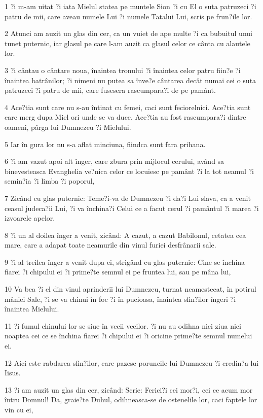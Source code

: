 \par 1 ?i m-am uitat ?i iata Mielul statea pe muntele Sion ?i cu El o suta patruzeci ?i patru de mii, care aveau numele Lui ?i numele Tatalui Lui, scris pe frun?ile lor.
\par 2 Atunci am auzit un glas din cer, ca un vuiet de ape multe ?i ca bubuitul unui tunet puternic, iar glasul pe care l-am auzit ca glasul celor ce cânta cu alautele lor.
\par 3 ?i cântau o cântare noua, înaintea tronului ?i înaintea celor patru fiin?e ?i înaintea batrânilor; ?i nimeni nu putea sa înve?e cântarea decât numai cei o suta patruzeci ?i patru de mii, care fusesera rascumpara?i de pe pamânt.
\par 4 Ace?tia sunt care nu s-au întinat cu femei, caci sunt feciorelnici. Ace?tia sunt care merg dupa Miel ori unde se va duce. Ace?tia au fost rascumpara?i dintre oameni, pârga lui Dumnezeu ?i Mielului.
\par 5 Iar în gura lor nu s-a aflat minciuna, fiindca sunt fara prihana.
\par 6 ?i am vazut apoi alt înger, care zbura prin mijlocul cerului, având sa binevesteasca Evanghelia ve?nica celor ce locuiesc pe pamânt ?i la tot neamul ?i semin?ia ?i limba ?i poporul,
\par 7 Zicând cu glas puternic: Teme?i-va de Dumnezeu ?i da?i Lui slava, ca a venit ceasul judeca?ii Lui, ?i va închina?i Celui ce a facut cerul ?i pamântul ?i marea ?i izvoarele apelor.
\par 8 ?i un al doilea înger a venit, zicând: A cazut, a cazut Babilonul, cetatea cea mare, care a adapat toate neamurile din vinul furiei desfrânarii sale.
\par 9 ?i al treilea înger a venit dupa ei, strigând cu glas puternic: Cine se închina fiarei ?i chipului ei ?i prime?te semnul ei pe fruntea lui, sau pe mâna lui,
\par 10 Va bea ?i el din vinul aprinderii lui Dumnezeu, turnat neamestecat, în potirul mâniei Sale, ?i se va chinui în foc ?i în pucioasa, înaintea sfin?ilor îngeri ?i înaintea Mielului.
\par 11 ?i fumul chinului lor se siue în vecii vecilor. ?i nu au odihna nici ziua nici noaptea cei ce se închina fiarei ?i chipului ei ?i oricine prime?te semnul numelui ei.
\par 12 Aici este rabdarea sfin?ilor, care pazesc poruncile lui Dumnezeu ?i credin?a lui Iisus.
\par 13 ?i am auzit un glas din cer, zicând: Scrie: Ferici?i cei mor?i, cei ce acum mor întru Domnul! Da, graie?te Duhul, odihneasca-se de ostenelile lor, caci faptele lor vin cu ei,
